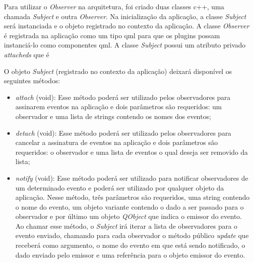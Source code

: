 Para utilizar o \textit{Observer} na arquitetura, foi criado duas classes c++, uma chamada \textit{Subject} e outra \textit{Observer}. Na inicialização da aplicação, a classe \textit{Subject} será instanciada e o objeto registrado no contexto da aplicação. A classe \textit{Observer} é registrada na aplicação como um tipo qml para que os plugins possam instanciá-lo como componentes qml. A classe \textit{Subject} possui um atributo privado \textit{attacheds} que é 

O objeto \textit{Subject} (registrado no contexto da aplicação) deixará disponível os seguintes métodos: 

\begin{itemize}
	\item \textit{attach} (void): Esse método poderá ser utilizado pelos observadores para assinarem eventos na aplicação e dois parâmetros são requeridos: um observador e uma lista de strings contendo os nomes dos eventos;
	\item \textit{detach} (void): Esse método poderá ser utilizado pelos observadores para cancelar a assinatura de eventos na aplicação e dois parâmetros são requeridos: o observador e uma lista de eventos o qual deseja ser removido da lista;
	\item \textit{notify} (void): Esse método poderá ser utilizado para notificar observadores de um determinado evento e poderá ser utilizado por qualquer objeto da aplicação. Nesse método, três parâmetros são requeridos, uma string contendo o nome do evento, um objeto variante contendo o dado a ser passado para o observador e por último um objeto \textit{QObject} que indica o emissor do evento. Ao chamar esse método, o \textit{Subject} irá iterar a lista de observadores para o evento enviado, chamando para cada observador o método público \textit{update} que receberá como argumento, o nome do evento em que está sendo notificado, o dado enviado pelo emissor e uma referência para o objeto emissor do evento.
\end{itemize}


